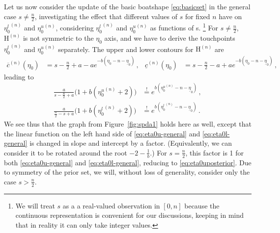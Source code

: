 \documentclass[runningheads,a4paper]{llncs}
\newcommand{\un}{^{(n)}} %
\newcommand{\ul}[1]{\underline{#1}}
\newcommand{\ol}[1]{\overline{#1}}
\def\ynl{\ul{y}\un}
\def\ynu{\ol{y}\un}
\def\EN{\mathrm{H}\un}
\newcommand{\ez}{\eta_0}
\def\ezl{\ul{\eta}_0}
\begin{document}
Let us now consider the update of the basic boatshape \eqref{eq:basicset} %
in the general case $s \neq \frac{n}{2}$,
investigating the effect that different values of $s$ for fixed $n$ have
on ${\eta_0^l}\un$ and ${\eta_0^u}\un$, %
considering ${\eta_0^l}\un$ and ${\eta_0^u}\un$ as functions of s.%
\footnote{We will treat $s$ as a a real-valued observation in $[0,n]$
because the continuous representation is convenient for our discussions,
keeping in mind that in reality it can only take integer values.}
For $s \neq \frac{n}{2}$, $\EN$ is not symmetric to the $\ez$ axis,
and we have to derive the touchpoints ${\eta_0^l}\un$ and ${\eta_0^u}\un$ separately.
%
The upper and lower contours for $\EN$ are
\begin{align*}
\ol{c}\un(\eta_0)                   &= s - \frac{n}{2} + a - a e^{-b(\eta_0 - n - \ezl)} \,, &
\ul{c}\un(\eta_0)                   &= s - \frac{n}{2} - a + a e^{-b(\eta_0 - n - \ezl)} \,,
\end{align*}
leading to
\begin{align}
\label{eq:eta0u-general}
\frac{a}{s - \frac{n}{2} + a} \big(1 + b({\eta_0^u}\un + 2)\big) &\stackrel{!}{=} e^{b({\eta_0^u}\un - n - \ezl)} \,,\\
\label{eq:eta0l-general}
\frac{a}{\frac{n}{2} -s  + a} \big(1 + b({\eta_0^l}\un + 2)\big) &\stackrel{!}{=} e^{b({\eta_0^l}\un - n - \ezl)} \,.
\end{align}
We see thus that the graph from Figure~\ref{fig:spda1} holds here as well,
except that the linear function on the left hand side of 
\eqref{eq:eta0u-general} and \eqref{eq:eta0l-general} is changed in slope and intercept by a factor.
(Equivalently, we can consider it to be rotated around the root $-2-\frac{1}{b}$.)
For $s=\frac{n}{2}$, this factor is 1 for both \eqref{eq:eta0u-general} and \eqref{eq:eta0l-general},
reducing to \eqref{eq:eta0uposterior}.
Due to symmetry of the prior set, we will, without loss of generality,
consider only the case $s > \frac{n}{2}$.

\end{document}
